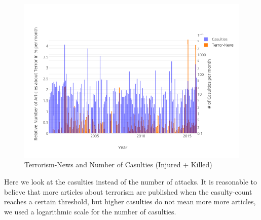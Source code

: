 \begin{figure}[h]
 \centering
 \includegraphics[width=.8\textwidth]{images/zeit/western_casulties}
 \caption{Terrorism-News and Number of Casulties (Injured + Killed)}
 \label{fig:zeit_terrorism_western_casulties}
\end{figure}
Here we look at the casulties instead of the number of attacks.
It is reasonable to believe that more articles about terrorism are published when the casulty-count reaches a certain threshold,
but higher casulties do not mean more more articles, we used a logarithmic scale for the number of casulties.

